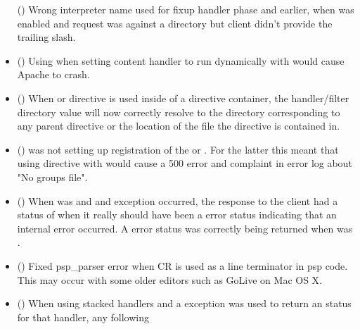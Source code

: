 \begin{itemize}
      ()
      Wrong interpreter name used for fixup handler phase and earlier, when
       was enabled and request was against
      a directory but client didn't provide the trailing slash.
    \item
      ()
      Using  when setting content handler to
      run dynamically with  would cause Apache to
      crash.
    \item
      ()
      When  or  directive is used
      inside of a  directive container, the handler/filter
      directory value will now correctly resolve to the directory corresponding
      to any parent  directive or the location of the
       file the  directive is contained in.
    \item
      ()
       was not setting up registration of the
       or . For the
      latter this meant that using  directive with
       would cause a 500 error and complaint in
      error log about "No groups file".
    \item
      ()
      When  was  and and exception occurred, the
      response to the client had a status of  when it really should
      have been a  error status indicating that an internal error
      occurred. A  error status was correctly being returned when
       was .
    \item
      ()
      Fixed psp_parser error when CR is used as a line terminator in psp code.
      This may occur with some older editors such as GoLive on Mac OS X.
    \item
      ()
      When using stacked handlers and a  exception was
      used to return an  status for that handler, any following

\end{itemize}
